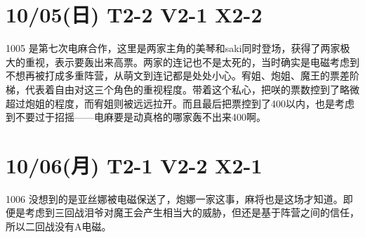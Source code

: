 \section{10/05(日) T2-2 V2-1 X2-2}


1005 是第七次电麻合作，这里是两家主角的美琴和saki同时登场，获得了两家极大的重视，表示要轰出来高票。两家的连记也不是太死的，当时确实是电磁考虑到不想再被打成多重阵营，从萌文到连记都是处处小心。宥姐、炮姐、魔王的票差阶梯，代表着自由对这三个角色的重视程度。带着这个私心，把咲的票数控到了略微超过炮姐的程度，而宥姐则被远远拉开。而且最后把票控到了400以内，也是考虑到不要过于招摇——电麻要是动真格的哪家轰不出来400啊。

\section{10/06(月) T2-1 V2-2 X2-1}


1006 没想到的是亚丝娜被电磁保送了，炮娜一家这事，麻将也是这场才知道。即便是考虑到三回战泪爷对魔王会产生相当大的威胁，但还是基于阵营之间的信任，所以二回战没有A电磁。

